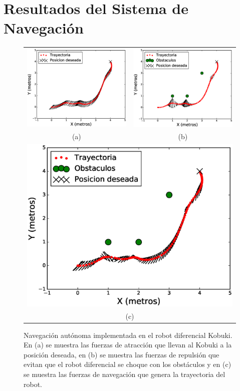 \section{Resultados del Sistema de Navegación}
\begin{figure}%
  \centering
  \begin{tabular}{cc}
     \includegraphics[width=0.51\linewidth]{images/attr_kbki.eps}&
     \includegraphics[width=0.51\linewidth]{images/rep_kbki.eps}\\
    (a) & (b)\\
    \multicolumn{2}{c}{\includegraphics[width=0.52\linewidth]{images/nav_kbki.eps}}\\
    \multicolumn{2}{c}{(c)}
  \end{tabular}
 
  \caption{Navegación autónoma implementada en el robot diferencial Kobuki. En (a) se muestra
  las fuerzas de atracción que llevan al Kobuki a la posición deseada, en (b) se muestra las 
  fuerzas de repulsión que evitan que el robot diferencial se choque con los obstáculos y en 
  (c) se muestra las fuerzas de navegación que genera la trayectoria del robot.}
  \label{f:kbki_APF}
 \end{figure}
